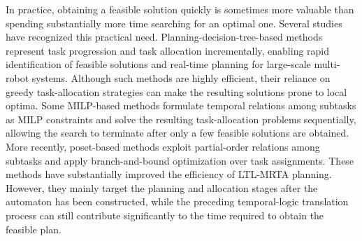 \documentclass[lettersize,journal]{IEEEtran}
\theoremstyle{italiclemma}
\theoremstyle{italiclemma}
\theoremstyle{definition}
\begin{document}
In practice, obtaining a feasible solution quickly is sometimes more valuable than spending substantially more time searching for an optimal one. Several studies have recognized this practical need. 
Planning-decision-tree-based methods\cite{Chen2024RealTimeReactive, 2025Task,10168225 } represent task progression and task allocation incrementally, enabling rapid identification of feasible solutions and real-time planning for large-scale multi-robot systems. Although such methods are highly efficient, their reliance on greedy task-allocation strategies can make the resulting solutions prone to local optima. Some MILP-based methods \cite{luo2022temporal,9663414}  formulate temporal relations among subtasks as MILP constraints and solve the resulting task-allocation problems sequentially, allowing the search to terminate after only a few feasible solutions are obtained. More recently, poset-based methods \cite{liu2024time} exploit partial-order relations among subtasks and apply branch-and-bound optimization over task assignments. These methods have substantially improved the efficiency of LTL-MRTA planning. However, they mainly target the planning and allocation stages after the automaton has been constructed, while the preceding temporal-logic translation process can still contribute significantly to the time required to obtain the feasible plan.
\end{document}
